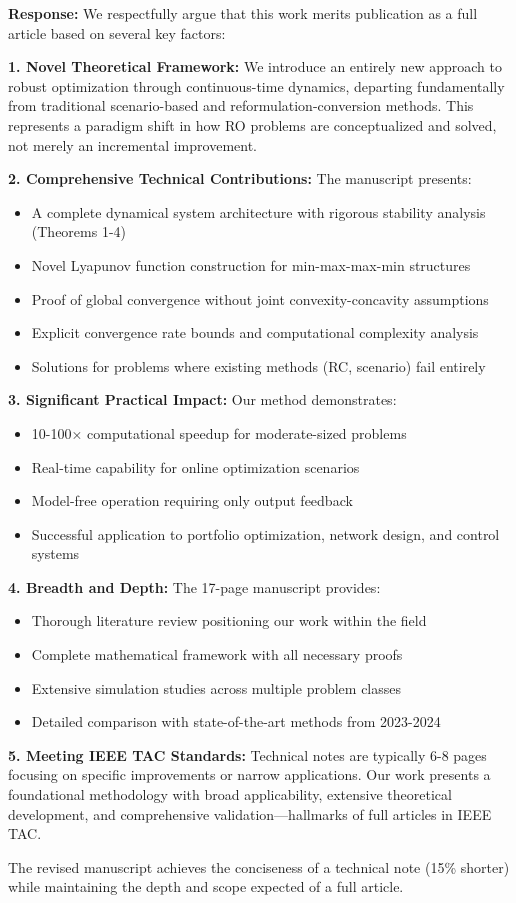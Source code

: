 \documentclass[11pt]{article}
\newcommand{\response}[1]{\textbf{Response:} #1}
\begin{document}
\response{We respectfully argue that this work merits publication as a full article based on several key factors:

\textbf{1. Novel Theoretical Framework:} We introduce an entirely new approach to robust optimization through continuous-time dynamics, departing fundamentally from traditional scenario-based and reformulation-conversion methods. This represents a paradigm shift in how RO problems are conceptualized and solved, not merely an incremental improvement.

\textbf{2. Comprehensive Technical Contributions:} The manuscript presents:
\begin{itemize}[topsep=2pt,itemsep=1pt]
\item A complete dynamical system architecture with rigorous stability analysis (Theorems 1-4)
\item Novel Lyapunov function construction for min-max-max-min structures
\item Proof of global convergence without joint convexity-concavity assumptions
\item Explicit convergence rate bounds and computational complexity analysis
\item Solutions for problems where existing methods (RC, scenario) fail entirely
\end{itemize}

\textbf{3. Significant Practical Impact:} Our method demonstrates:
\begin{itemize}[topsep=2pt,itemsep=1pt]
\item 10-100× computational speedup for moderate-sized problems
\item Real-time capability for online optimization scenarios
\item Model-free operation requiring only output feedback
\item Successful application to portfolio optimization, network design, and control systems
\end{itemize}

\textbf{4. Breadth and Depth:} The 17-page manuscript provides:
\begin{itemize}[topsep=2pt,itemsep=1pt]
\item Thorough literature review positioning our work within the field
\item Complete mathematical framework with all necessary proofs
\item Extensive simulation studies across multiple problem classes
\item Detailed comparison with state-of-the-art methods from 2023-2024
\end{itemize}

\textbf{5. Meeting IEEE TAC Standards:} Technical notes are typically 6-8 pages focusing on specific improvements or narrow applications. Our work presents a foundational methodology with broad applicability, extensive theoretical development, and comprehensive validation—hallmarks of full articles in IEEE TAC.

The revised manuscript achieves the conciseness of a technical note (15\% shorter) while maintaining the depth and scope expected of a full article.}
\end{document}
